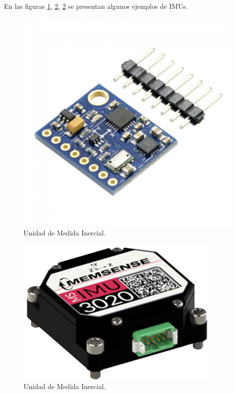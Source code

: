 En las figuras \ref{fig:IMU12}, \ref{fig:IMU2}, \ref{fig:IMU2} se presentan algunos ejemplos de IMUs.

\begin{figure}[H]
	\center
	\includegraphics[scale=0.2]{imagenes/Balancing_robot/IMU1}
	\caption{Unidad de Medida Inercial.}
	\label{fig:IMU12}
\end{figure}

\begin{figure}[H]
	\center
	\includegraphics[scale=0.2]{imagenes/Balancing_robot/IMU2}
	\caption{Unidad de Medida Inercial.}
	\label{fig:IMU2}
\end{figure}

